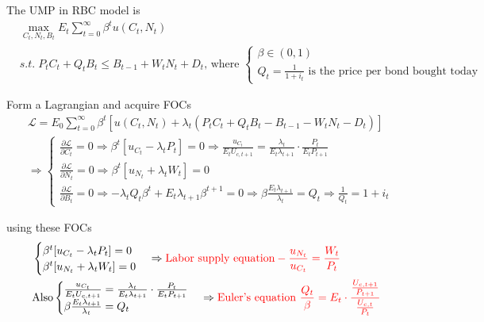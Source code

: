 \documentclass{article}
\begin{document}
The UMP in RBC model is 
\begin{align}
&\max\limits_{C_{t},N_{t},B_{t}} E_t \sum\limits_{t=0}^{\infty}\beta^{t}u(C_{t},N_{t})
\\&
s.t. \; P_{t}C_{t}+Q_{t}B_{t}\leqslant B_{t-1}+W_{t}N_{t}+D_{t} 
\text{, where } 
\begin{cases}
\beta \in (0,1) \\
Q_{t}=\frac{1}{1+i_{t}} \text{ is the price per bond bought today}
\end{cases}
\end{align}

Form a Lagrangian and acquire FOCs
\begin{align}
&\mathscr{L}=E_{0} \sum\limits_{t=0}^{\infty}\beta^{t}[u(C_{t},N_{t})+\lambda_{t}(P_{t}C_{t}+Q_{t}B_{t}-B_{t-1}-W_{t}N_{t}-D_{t} )]
\\&
\Rightarrow 
\begin{cases}\frac{\partial  \mathscr{L}}{\partial C_{t}}=0 \Rightarrow \beta^{t}[u_{C_{t}} -\lambda_{t}P_{t}]=0 \Rightarrow \frac{u_{C_{t}}}{E_{t}U_{c,t+1}}=\frac{\lambda_{t}}{E_{t}\lambda_{t+1}} \cdot \frac{P_{t}}{E_{t}{P_{t+1}}} \\
\frac{\partial  \mathscr{L}}{\partial N_{t}}=0 \Rightarrow \beta^{t}[u_{N_{t}}+\lambda_{t} W_{t}] =0 \\
\frac{\partial  \mathscr{L}}{\partial B_{t}}=0 \Rightarrow -\lambda_{t}Q_{t}\beta^{t}+E_{t}\lambda_{t+1}\beta^{t+1}=0 \Rightarrow \beta \frac{E_{t}\lambda_{t+1}}{\lambda_{t}}=Q_{t} \Rightarrow \frac{1}{Q_{t}}=1+i_{t} 
\end{cases}
\end{align}

using these FOCs 
\begin{align}
&\begin{cases}
  \beta^{t}[u_{C_{t}} -\lambda_{t}P_{t}]=0 \\
  \beta^{t}[u_{N_{t}}+\lambda_{t} W_{t}] =0
\end{cases} \Rightarrow \color{red} \text{Labor supply equation} -\frac{u_{N_{t}}}{u_{C_{t}}}=\frac{W_{t}}{P_{t}}
\\&
\text{Also} \begin{cases}\frac{u_{C_{t}}}{E_{t}U_{c,t+1}}=\frac{\lambda_{t}}{E_{t}\lambda_{t+1}} \cdot \frac{P_{t}}{E_{t}{P_{t+1}}} \\
\beta \frac{E_{t}\lambda_{t+1}}{\lambda_{t}}=Q_{t}
\end{cases} 
\Rightarrow \color{red} \text{Euler's equation } \frac{Q_{t}}{\beta}=E_{t}\cdot 
\frac{\frac{U_{c,t+1}}{P_{t+1}}}{\frac{U_{c,t}}{P_{t}}}
\end{align}
\end{document}
